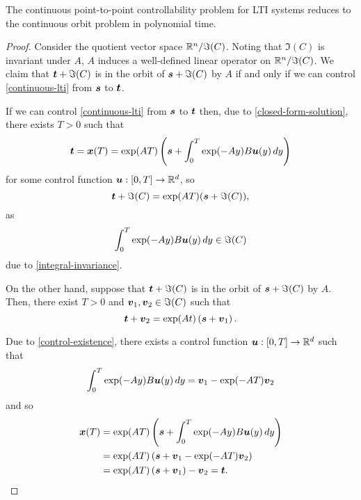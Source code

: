 \begin{theorem}
The continuous point-to-point controllability problem for LTI systems reduces to the continuous orbit problem in polynomial time.
\end{theorem}

\begin{proof}
Consider the quotient vector space $\mathbb{R}^{n} / \Im(C)$. Noting that $\Im(C)$ is invariant under $A$, $A$ induces a well-defined linear operator on $\mathbb{R}^{n} / \Im(C)$. We claim that $\boldsymbol{t} + \Im(C)$ is in the orbit of $\boldsymbol{s} + \Im(C)$ by $A$ if and only if we can control \cref{continuous-lti} from $\boldsymbol{s}$ to $\boldsymbol{t}$.

If we can control \cref{continuous-lti} from $\boldsymbol{s}$ to $\boldsymbol{t}$ then, due to \cref{closed-form-solution}, there exists $T>0$ such that
\begin{equation*}
\boldsymbol{t} = \boldsymbol{x}(T) = \exp(A T) \left( \boldsymbol{s} + \int_{0}^{T} \exp(-Ay) B \boldsymbol{u}(y) \, dy \right)
\end{equation*}
for some control function $\boldsymbol{u} : [0,T] \rightarrow \mathbb{R}^{d}$, so
\begin{equation*}
\boldsymbol{t} + \Im(C) = \exp(A T) (\boldsymbol{s} + \Im(C)),
\end{equation*}
as
\begin{equation*}
\int_{0}^{T} \exp(-Ay) B \boldsymbol{u}(y) \, dy \in \Im(C)
\end{equation*}
due to \cref{integral-invariance}.

On the other hand, suppose that $\boldsymbol{t} + \Im(C)$ is in the orbit of $\boldsymbol{s} + \Im(C)$ by $A$. Then, there exist $T>0$ and $\boldsymbol{v}_{1}, \boldsymbol{v}_{2} \in \Im(C)$ such that
\begin{equation*}
\boldsymbol{t} + \boldsymbol{v}_{2} = \exp(At) \left( \boldsymbol{s} + \boldsymbol{v}_{1} \right).
\end{equation*}

Due to \cref{control-existence}, there exists a control function $\boldsymbol{u} : [0,T] \rightarrow \mathbb{R}^{d}$ such that
\begin{equation*}
\int_{0}^{T} \exp(-Ay) B \boldsymbol{u}(y) \, dy = \boldsymbol{v}_{1} - \exp(-A T) \boldsymbol{v}_{2}
\end{equation*}
and so
\begin{align*}
\boldsymbol{x}(T) &= \exp(A T) \left( \boldsymbol{s} + \int_{0}^{T} \exp(-Ay) B \boldsymbol{u}(y) \, dy \right) \\
&= \exp(A T) \left( \boldsymbol{s} + \boldsymbol{v}_{1} - \exp(-A T) \boldsymbol{v}_{2} \right) \\
&= \exp(A T) \left( \boldsymbol{s} + \boldsymbol{v}_{1} \right) - \boldsymbol{v}_{2} = \boldsymbol{t} .
\end{align*}

\end{proof}
